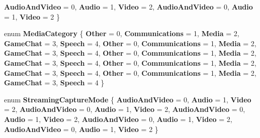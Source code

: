 \begin{DoxyCompactItemize}
{\bfseries Audio\+And\+Video} = 0, 
{\bfseries Audio} = 1, 
{\bfseries Video} = 2, 
\newline
{\bfseries Audio\+And\+Video} = 0, 
{\bfseries Audio} = 1, 
{\bfseries Video} = 2
 \}
\item 
\mbox{\label{namespace_windows_1_1_media_1_1_capture_a2061b374080798df6bea2b4f65634663}} 
enum {\bfseries Media\+Category} \{ \newline
{\bfseries Other} = 0, 
{\bfseries Communications} = 1, 
{\bfseries Media} = 2, 
{\bfseries Game\+Chat} = 3, 
\newline
{\bfseries Speech} = 4, 
{\bfseries Other} = 0, 
{\bfseries Communications} = 1, 
{\bfseries Media} = 2, 
\newline
{\bfseries Game\+Chat} = 3, 
{\bfseries Speech} = 4, 
{\bfseries Other} = 0, 
{\bfseries Communications} = 1, 
\newline
{\bfseries Media} = 2, 
{\bfseries Game\+Chat} = 3, 
{\bfseries Speech} = 4, 
{\bfseries Other} = 0, 
\newline
{\bfseries Communications} = 1, 
{\bfseries Media} = 2, 
{\bfseries Game\+Chat} = 3, 
{\bfseries Speech} = 4, 
\newline
{\bfseries Other} = 0, 
{\bfseries Communications} = 1, 
{\bfseries Media} = 2, 
{\bfseries Game\+Chat} = 3, 
\newline
{\bfseries Speech} = 4
 \}
\item 
\mbox{\label{namespace_windows_1_1_media_1_1_capture_a69a6672cfbdb543586234a95b0049c04}} 
enum {\bfseries Streaming\+Capture\+Mode} \{ \newline
{\bfseries Audio\+And\+Video} = 0, 
{\bfseries Audio} = 1, 
{\bfseries Video} = 2, 
{\bfseries Audio\+And\+Video} = 0, 
\newline
{\bfseries Audio} = 1, 
{\bfseries Video} = 2, 
{\bfseries Audio\+And\+Video} = 0, 
{\bfseries Audio} = 1, 
\newline
{\bfseries Video} = 2, 
{\bfseries Audio\+And\+Video} = 0, 
{\bfseries Audio} = 1, 
{\bfseries Video} = 2, 
\newline
{\bfseries Audio\+And\+Video} = 0, 
{\bfseries Audio} = 1, 
{\bfseries Video} = 2
 \}
\item 
\mbox{\label{namespace_windows_1_1_media_1_1_capture_a2061b374080798df6bea2b4f65634663}} 

\end{DoxyCompactItemize}
